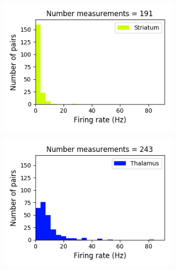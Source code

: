\documentclass[a4paper,12pt]{article}
\theoremstyle{definition}
\begin{document}
\begin{figure}[p]
\begin{subfigure}{0.5\textwidth}
    \includegraphics[width=\textwidth]{figures/all_striatum_8_1p0_firing_rate_histogram.png}
  \end{subfigure}
  \begin{subfigure}{0.5\textwidth}
    \centering
    \includegraphics[width=\textwidth]{figures/all_thalamus_8_1p0_firing_rate_histogram.png}
  \end{subfigure}
  \begin{subfigure}{0.5\textwidth}
    \centering

\end{subfigure}
\end{figure}
\end{document}
